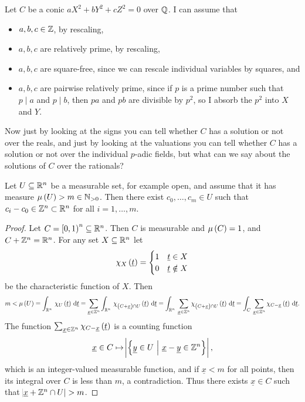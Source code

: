 Let $ C $ be a conic $ aX^2 + bY^2 + cZ^2 = 0 $ over $ \mathbb{Q} $. I can assume that
\begin{itemize}
\item $ a, b, c \in \mathbb{Z} $, by rescaling,
\item $ a, b, c $ are relatively prime, by rescaling,
\item $ a, b, c $ are square-free, since we can rescale individual variables by squares, and
\item $ a, b, c $ are pairwise relatively prime, since if $ p $ is a prime number such that $ p \mid a $ and $ p \mid b $, then $ pa $ and $ pb $ are divisible by $ p^2 $, so I absorb the $ p^2 $ into $ X $ and $ Y $.
\end{itemize}
Now just by looking at the signs you can tell whether $ C $ has a solution or not over the reals, and just by looking at the valuations you can tell whether $ C $ has a solution or not over the individual $ p $-adic fields, but what can we say about the solutions of $ C $ over the rationals?

\begin{lemma}
\label{lem:5.1}
Let $ U \subseteq \mathbb{R}^n $ be a measurable set, for example open, and assume that it has measure $ \mu\br{U} > m \in \NN_{> 0} $. Then there exist $ c_0, \dots, c_m \in U $ such that $ c_i - c_0 \in \mathbb{Z}^n \subset \mathbb{R}^n $ for all $ i = 1, \dots, m $.
\end{lemma}

\begin{proof}
Let $ C = \intco{0, 1}^n \subseteq \RR^n $. Then $ C $ is measurable and $ \mu\br{C} = 1 $, and $ C + \mathbb{Z}^n = \mathbb{R}^n $. For any set $ X \subseteq \mathbb{R}^n $ let
$$ \chi_X\br{\underline{t}} =
\begin{cases}
1 & \underline{t} \in X \\
0 & \underline{t} \notin X
\end{cases}
$$
be the characteristic function of $ X $. Then
$$ m < \mu\br{U} = \intd{\RR^n}{}{\chi_U\br{\underline{t}}}{\underline{t}} = \sum_{\underline{x} \in \ZZ^n} \intd{\RR^n}{}{\chi_{\br{C + \underline{x}} \cap U}\br{\underline{t}}}{\underline{t}} = \intd{\RR^n}{}{\sum_{\underline{x} \in \ZZ^n} \chi_{\br{C + \underline{x}} \cap U}\br{\underline{t}}}{\underline{t}} = \intd{C}{}{\sum_{\underline{x} \in \ZZ^n} \chi_{C - \underline{x}}\br{\underline{t}}}{\underline{t}}. $$
The function $ \sum_{\underline{x} \in \ZZ^n} \chi_{C - \underline{x}}\br{\underline{t}} $ is a counting function
$$ \underline{x} \in C \mapsto \abs{\cbr{\underline{y} \in U \st \underline{x} - \underline{y} \in \ZZ^n}}, $$
which is an integer-valued measurable function, and if $ \underline{x} < m $ for all points, then its integral over $ C $ is less than $ m $, a contradiction. Thus there exists $ \underline{x} \in C $ such that $ \abs{\underline{x} + \mathbb{Z}^n \cap U} > m $.
\end{proof}

